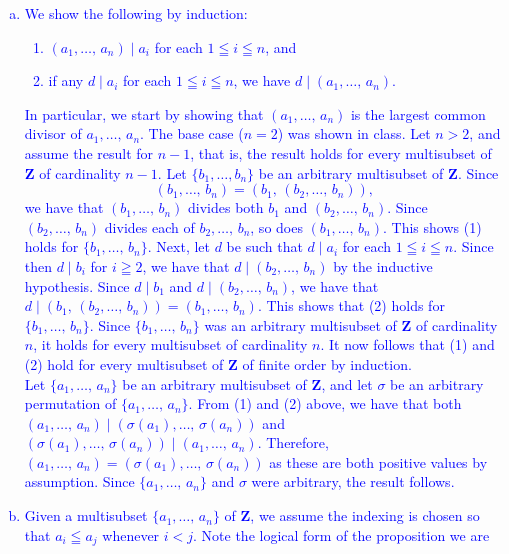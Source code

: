\documentclass[a4paper,11pt]{article}
\theoremstyle{mythm}
\theoremstyle{mydef}
\newcommand{\blue}[1]{\textcolor{blue}{#1}}
\newcommand{\Z}{\mathbf{Z}}
\begin{document}
\blue{
  \begin{enumerate}[(a)]
  \item We show the following by induction:
    \begin{enumerate}[(1)]
    \item $(a_1,\dots,\,a_n) \mid a_i$ for each $1 \leqq i \leqq n$, and
    \item if any $d \mid a_i$ for each $1 \leqq i \leqq n$, we have $d \mid
      (a_1,\dots,\,a_n)$.
    \end{enumerate}
    In particular, we start by showing that $(a_1,\dots,\,a_n)$ is the largest
    common divisor of $a_1,\dots,\,a_n$.
    The base case ($n=2$) was shown in class. Let $n > 2$, and assume the result
    for $n-1$, that is, the result holds for every multisubset of $\Z$ of
    cardinality $n-1$. Let $\{b_1,\dots,b_n\}$ be an arbitrary multisubset of
    $\Z$. Since
    \[
      (b_1,\dots,\,b_n) = (b_1,\,(b_2,\dots,\,b_n)),
    \]
    we have that $(b_1,\dots,\,b_n)$ divides both $b_1$ and $(b_2,\dots,\,b_n)$.
    Since $(b_2,\dots,\,b_n)$ divides each of $b_2,\dots,\,b_n$, so does
    $(b_1,\dots,\,b_n)$. This shows (1) holds for $\{b_1,\dots,\,b_n\}$. Next,
    let $d$ be such that $d \mid a_i$ for each $1 \leqq i \leqq n$. Since then
    $d \mid b_i$ for $i \geqq 2$, we have that $d \mid (b_2,\dots,\,b_n)$ by the
    inductive hypothesis. Since $d \mid b_1$ and $d \mid (b_2,\dots,\,b_n)$, we
    have that $d \mid (b_1,\,(b_2,\dots,\,b_n))=(b_1,\dots,\,b_n)$. This shows
    that (2) holds for $\{b_1,\dots,\,b_n\}$. Since $\{b_1,\dots,\,b_n\}$ was an
    arbitrary multisubset of $\Z$ of cardinality $n$, it holds for every
    multisubset of cardinality $n$. It now follows that (1) and (2) hold for
    every multisubset of $\Z$ of finite order by induction. \\
    Let $\{a_1,\dots,\,a_n\}$ be an arbitrary multisubset of $\Z$, and let
    $\sigma$ be an arbitrary permutation of $\{a_1,\dots,\,a_n\}$. From (1) and
    (2) above, we have that both $(a_1,\dots,\,a_n) \mid
    (\sigma(a_1),\dots,\,\sigma(a_n))$ and $(\sigma(a_1),\dots,\,\sigma(a_n))
    \mid (a_1,\dots,\,a_n)$. Therefore,
    $(a_1,\dots,\,a_n)=(\sigma(a_1),\dots,\,\sigma(a_n))$ as these are both
    positive values by assumption. Since $\{a_1,\dots,\,a_n\}$ and $\sigma$ were
    arbitrary, the result follows.
  \item Given a multisubset
$\{a_1,\dots,\,a_n\}$ of $\Z$, we assume the indexing is chosen so that $a_i
\leqq a_j$ whenever $i < j$. Note the logical form of the proposition we are

\end{enumerate}}
\end{document}
